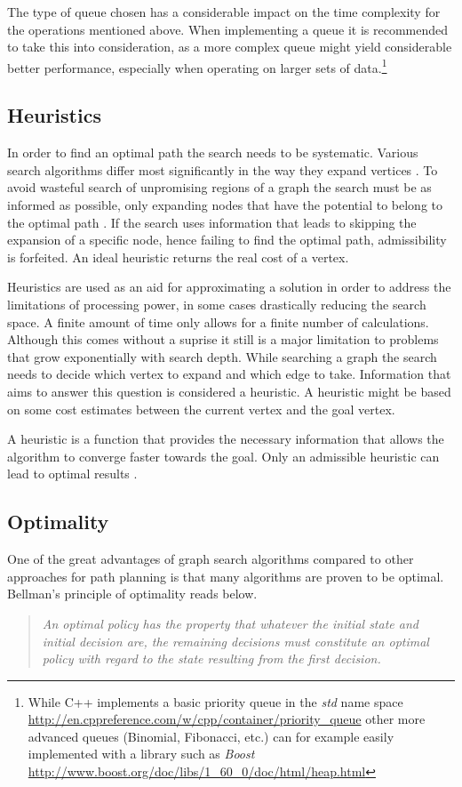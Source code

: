 The type of queue chosen has a considerable impact on the time complexity for the operations mentioned above. When implementing a queue it is recommended to take this into consideration, as a more complex queue might yield considerable better performance, especially when operating on larger sets of data.\footnote{While C++ implements a basic priority queue in the \emph{std} name space \url{http://en.cppreference.com/w/cpp/container/priority_queue} other more advanced queues (Binomial, Fibonacci, etc.) can for example easily implemented with a library such as \emph{Boost} \url{http://www.boost.org/doc/libs/1_60_0/doc/html/heap.html}}

\subsection{Heuristics}
In order to find an optimal path the search needs to be systematic. Various search algorithms differ most significantly in the way they expand vertices \cite{LaValle.2006}. To avoid wasteful search of unpromising regions of a graph the search must be as informed as possible, only expanding nodes that have the potential to belong to the optimal path \cite{Hart.1968}. If the search uses information that leads to skipping the expansion of a specific node, hence failing to find the optimal path, admissibility is forfeited. An ideal heuristic returns the real cost of a vertex.

Heuristics are used as an aid for approximating a solution in order to address the limitations of processing power, in some cases drastically reducing the search space. A finite amount of time only allows for a finite number of calculations. Although this comes without a suprise it still is a major limitation to problems that grow exponentially with search depth. While searching a graph the search needs to decide which vertex to expand and which edge to take. Information that aims to answer this question is considered a heuristic. A heuristic might be based on some cost estimates between the current vertex and the goal vertex. \cite{Newell.1976} 

A heuristic is a function that provides the necessary information that allows the algorithm to converge faster towards the goal. Only an admissible heuristic can lead to optimal results \cite{Hart.1968}.

\subsection{Optimality}
One of the great advantages of graph search algorithms compared to other approaches for path planning is that many algorithms are proven to be optimal. Bellman's principle of optimality reads below.
\begin{quotation}
    \noindent \emph{An optimal policy has the property that whatever the initial state and initial decision are, the remaining decisions must constitute an optimal policy with regard to the state resulting from the first decision.} \cite{Bellman.2003}
\end{quotation}

